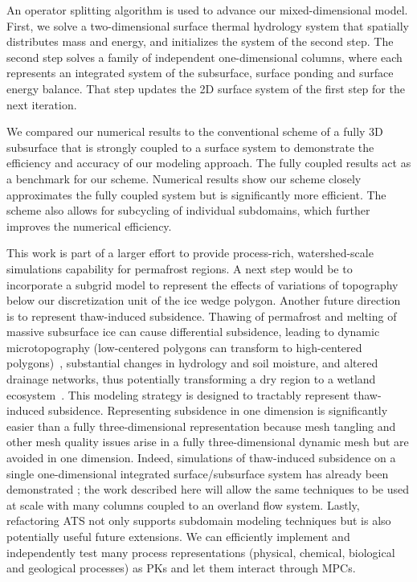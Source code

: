 \documentclass[review,11pt]{elsarticle}
\begin{document}
An operator splitting algorithm is used to advance our mixed-dimensional model. First, we solve a two-dimensional surface thermal hydrology system that spatially distributes mass and energy, and initializes the system of the second step. The second step solves a family of independent one-dimensional columns, where each represents an integrated system of the subsurface, surface ponding and surface energy balance. That step updates the 2D surface system of the first step for the next iteration.

We compared our numerical results to the conventional scheme of a fully 3D subsurface that is strongly coupled to a surface system to demonstrate the efficiency and accuracy of our modeling approach. The fully coupled results act as a benchmark for our scheme. Numerical results show our scheme closely approximates the fully coupled system but is significantly more efficient. The scheme also allows for subcycling of individual subdomains, which further improves the numerical efficiency. 

This work is part of a larger effort to provide process-rich, watershed-scale simulations capability for permafrost regions.  A next step would be to incorporate a subgrid model to represent the effects of  variations of topography below our discretization unit of the ice wedge polygon. Another future direction is to represent thaw-induced subsidence. Thawing of permafrost and melting of massive subsurface ice can cause differential subsidence, leading to dynamic microtopography (low-centered polygons can transform to high-centered polygons)~\cite{jorgenson2006abrupt,liljedahl2012ice}, substantial changes in hydrology and soil moisture, and altered drainage networks, thus potentially transforming a dry region to a wetland ecosystem~\cite{hinzman2005evidence,rowland2010arctic}. This modeling strategy is designed to tractably represent  thaw-induced subsidence. Representing subsidence in one dimension is significantly easier than a fully three-dimensional representation because mesh tangling and other mesh quality issues arise in a fully three-dimensional dynamic mesh but are avoided in one dimension. Indeed, simulations of thaw-induced subsidence on a single one-dimensional integrated surface/subsurface system has already been demonstrated \cite{painter2013modeling}; the work described here will allow the same techniques to be used at scale with many columns coupled to an overland flow system. Lastly, refactoring ATS not only supports subdomain modeling techniques but is also potentially useful future extensions. We can efficiently implement and independently test many process representations (physical, chemical, biological and geological processes) as PKs and let them interact through MPCs. 
 
\end{document}

